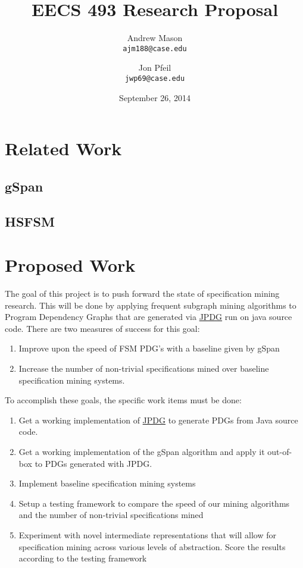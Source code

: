 \documentclass[12pt]{article}
\title{EECS 493 Research Proposal}
\author{
    Andrew Mason\\
    \texttt{ajm188@case.edu}
    \and
    Jon Pfeil\\
    \texttt{jwp69@case.edu}
}
\date{September 26, 2014}
\begin{document}
\maketitle
\tableofcontents
\pagebreak
\section{Related Work}
\subsection{gSpan}
\subsection{HSFSM}
\section{Proposed Work}
The goal of this project is to push forward the state of specification mining research. This will be done by applying frequent subgraph mining algorithms to Program Dependency Graphs that are generated via \hyperref[subsection:JPDG]{JPDG} run on java source code. There are two measures of success for this goal:

\begin{enumerate}
    \item Improve upon the speed of FSM PDG's with a baseline given by gSpan
    \item Increase the number of non-trivial specifications mined over baseline specification mining systems.
\end{enumerate}

\noindent To accomplish these goals, the specific work items must be done:

\begin{enumerate}
    \item Get a working implementation of \hyperref[subsection:JPDG]{JPDG} to generate PDGs from Java source code.
    \item Get a working implementation of the gSpan algorithm and apply it out-of-box to PDGs generated with JPDG.
    \item Implement baseline specification mining systems
    \item Setup a testing framework to compare the speed of our mining algorithms and the number of non-trivial specifications mined
    \item Experiment with novel intermediate representations that will allow for specification mining across various levels of abstraction. Score the results according to the testing framework
\end{enumerate}
\end{document}
